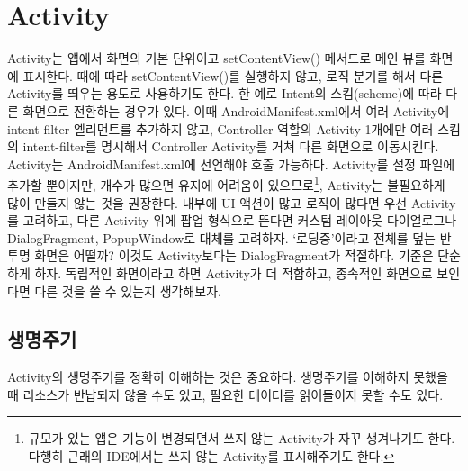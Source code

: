 \chapter{Activity}
Activity는 앱에서 화면의 기본 단위이고 setContentView() 메서드로 메인 뷰를 화면에 표시한다.
때에 따라 setContentView()를 실행하지 않고, 로직 분기를 해서 다른 Activity를 띄우는 용도로 사용하기도 한다.
한 예로 Intent의 스킴(scheme)에 따라 다른 화면으로 전환하는 경우가 있다. 
이때 AndroidManifest.xml에서 여러 Activity에 intent-filter 엘리먼트를 추가하지 않고, Controller 역할의 Activity 1개에만 여러 스킴의 intent-filter를 명시해서 Controller Activity를 거쳐 다른 화면으로 이동시킨다.\\

Activity는 AndroidManifest.xml에 선언해야 호출 가능하다. 
Activity를 설정 파일에 추가할 뿐이지만, 개수가 많으면 유지에 어려움이 있으므로\footnote{규모가 있는 앱은 기능이 변경되면서 쓰지 않는 Activity가 자꾸 생겨나기도 한다. 다행히 근래의 IDE에서는 쓰지 않는 Activity를 표시해주기도 한다.}, Activity는 불필요하게 많이 만들지 않는 것을 권장한다.
내부에 UI 액션이 많고 로직이 많다면 우선 Activity를 고려하고, 
다른 Activity 위에 팝업 형식으로 뜬다면 커스텀 레이아웃 다이얼로그나 DialogFragment, PopupWindow로 대체를 고려하자.
`로딩중'이라고 전체를 덮는 반투명 화면은 어떨까? 이것도 Activity보다는 DialogFragment가 적절하다.
기준은 단순하게 하자. 독립적인 화면이라고 하면 Activity가 더 적합하고, 종속적인 화면으로 보인다면 다른 것을 쓸 수 있는지 생각해보자.\\

\section{생명주기}
Activity의 생명주기를 정확히 이해하는 것은 중요하다. 
생명주기를 이해하지 못했을 때 리소스가 반납되지 않을 수도 있고, 필요한 데이터를 읽어들이지 못할 수도 있다.

